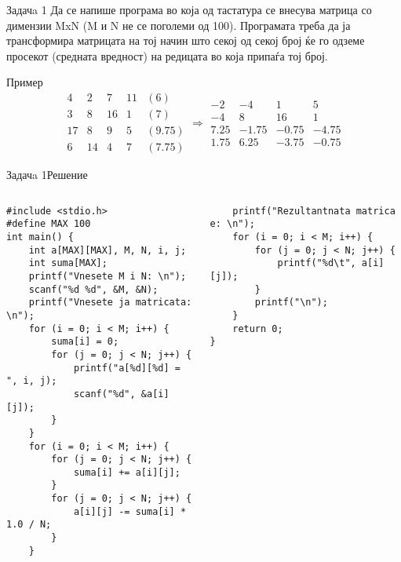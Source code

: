 \begin{frame}[fragile]{Задачa 1}
Да се напише програма во која од тастатура се внесува матрица со димензии MxN (M
и N не се поголеми од 100). Програмата треба да ја трансформира матрицата на тој
начин што секој од секој број ќе го одземе просекот (средната вредност) на
редицата во која припаѓа тој број.
\begin{exampleblock}{Пример}
\[
 \begin{matrix}
  4 & 2 & 7 & 11 & (6) \\
  3 & 8 & 16 & 1 & (7) \\
  17 & 8 & 9 & 5 & (9.75) \\
  6 & 14 & 4 & 7 & (7.75)
 \end{matrix}
 \Longrightarrow
 \begin{matrix}
 -2 & -4 & 1 & 5\\
 -4 & 8 & 16 & 1\\
 7.25 & -1.75 & -0.75 & -4.75\\
 1.75 & 6.25 & -3.75 & -0.75
 \end{matrix}
\]
\end{exampleblock}
\end{frame}

\begin{frame}[fragile]{Задачa 1}{Решение}
\begin{columns}
    \begin{lstlisting}
#include <stdio.h>
#define MAX 100
int main() {
    int a[MAX][MAX], M, N, i, j;
    int suma[MAX];
    printf("Vnesete M i N: \n");
    scanf("%d %d", &M, &N);
    printf("Vnesete ja matricata: \n");
    for (i = 0; i < M; i++) {
        suma[i] = 0;
        for (j = 0; j < N; j++) {
            printf("a[%d][%d] = ", i, j);
            scanf("%d", &a[i][j]);
        }
    }
    for (i = 0; i < M; i++) {
        for (j = 0; j < N; j++) {
            suma[i] += a[i][j];
        }
        for (j = 0; j < N; j++) {
            a[i][j] -= suma[i] * 1.0 / N;
        }
    }
\end{lstlisting}    
\begin{lstlisting}
    printf("Rezultantnata matrica e: \n");
    for (i = 0; i < M; i++) {
        for (j = 0; j < N; j++) {
            printf("%d\t", a[i][j]);
        }
        printf("\n");
    }
    return 0;
}
\end{lstlisting}
\end{columns}
\end{frame}

